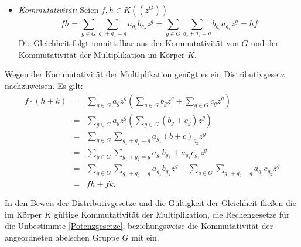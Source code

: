{\begin{itemize}
%
%
%
%
\item \textit{Kommutativität:} Seien $f,h \in K\left(\left(z^{G}\right)\right)$ 
\[fh = \sum_{g \in G}^{}\sum_{g_1 + g_2 = g}^{}a_{g_1} b_{g_2}z^g = \sum_{g \in G}^{}\sum_{g_2 + g_1 = g}^{}b_{g_2} a_{g_1}z^g = hf\]
Die Gleichheit folgt unmittelbar aus der Kommutativität von $G$ und der Kommutativität der Multiplikation im Körper $K$.\\
\end{itemize}

Wegen der Kommutativität der Multiplikation genügt es ein Distributivgesetz nachzuweisen. Es gilt:
\begin{eqnarray*}
f \cdot(h + k) &=& \sum_{g \in G}^{} a_g z^g  \left(\sum_{g \in G}^{} b_g z^g + \sum_{g \in G}^{} c_g z^g\right) \\
&=& \sum_{g \in G}^{} a_g z^g  \left(\sum_{g \in G}^{} \left(b_g + c_g\right) z^g \right)\\
&=& \sum_{g \in G}^{} \sum_{g_1 + g_2 = g}^{} a_{g_1}{\left(b + c\right)}_{g_2} z^g \\
&=& \sum_{g \in G}^{} \sum_{g_1 + g_2= g}^{} a_{g_1}b_{g_2} + a_{g_1}c_{g_2} z^g \\
&=& \sum_{g \in G}^{} \sum_{g_1 + g_2= g}^{} a_{g_1}b_{g_2}z^g + \sum_{g \in G}^{} \sum_{g_1 + g_2= g}^{} a_{g_1}c_{g_2} z^g \\
&=& fh + fk.
\end{eqnarray*}
%
%
%
% 
%
 
In den Beweis der Distributivgesetze und die Gültigkeit der Gleichheit fließen die im Körper $K$ gültige Kommutativität der Multiplikation, die Rechengesetze für die Unbestimmte \ref{Potenzgesetze}, beziehungsweise die Kommutativität der angeordneten abelschen Gruppe $G$ mit ein.  
}
%
